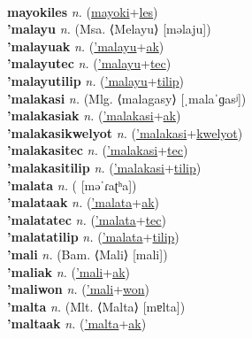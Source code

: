  \label{mayoki} \\
\textbf{mayokiles} \textit{n.} (\hyperref[mayoki]{mayoki}+\hyperref[les]{les})
 \label{mayokiles} \\
\textbf{'malayu} \textit{n.} (Msa. ⟨Melayu⟩ [məlaju])
 \label{'malayu} \\
\textbf{'malayuak} \textit{n.} (\hyperref['malayu]{'malayu}+\hyperref[ak]{ak})
 \label{'malayuak} \\
\textbf{'malayutec} \textit{n.} (\hyperref['malayu]{'malayu}+\hyperref[tec]{tec})
 \label{'malayutec} \\
\textbf{'malayutilip} \textit{n.} (\hyperref['malayu]{'malayu}+\hyperref[tilip]{tilip})
 \label{'malayutilip} \\
\textbf{'malakasi} \textit{n.} (Mlg. ⟨malagasy⟩ [ˌmalaˈɡasʲ])
 \label{'malakasi} \\
\textbf{'malakasiak} \textit{n.} (\hyperref['malakasi]{'malakasi}+\hyperref[ak]{ak})
 \label{'malakasiak} \\
\textbf{'malakasikwelyot} \textit{n.} (\hyperref['malakasi]{'malakasi}+\hyperref[kwelyot]{kwelyot})
 \label{'malakasikwelyot} \\
\textbf{'malakasitec} \textit{n.} (\hyperref['malakasi]{'malakasi}+\hyperref[tec]{tec})
 \label{'malakasitec} \\
\textbf{'malakasitilip} \textit{n.} (\hyperref['malakasi]{'malakasi}+\hyperref[tilip]{tilip})
 \label{'malakasitilip} \\
\textbf{'malata} \textit{n.} ( [məˈɾaʈʰa])
 \label{'malata} \\
\textbf{'malataak} \textit{n.} (\hyperref['malata]{'malata}+\hyperref[ak]{ak})
 \label{'malataak} \\
\textbf{'malatatec} \textit{n.} (\hyperref['malata]{'malata}+\hyperref[tec]{tec})
 \label{'malatatec} \\
\textbf{'malatatilip} \textit{n.} (\hyperref['malata]{'malata}+\hyperref[tilip]{tilip})
 \label{'malatatilip} \\
\textbf{'mali} \textit{n.} (Bam. ⟨Mali⟩ [mali])
 \label{'mali} \\
\textbf{'maliak} \textit{n.} (\hyperref['mali]{'mali}+\hyperref[ak]{ak})
 \label{'maliak} \\
\textbf{'maliwon} \textit{n.} (\hyperref['mali]{'mali}+\hyperref[won]{won})
 \label{'maliwon} \\
\textbf{'malta} \textit{n.} (Mlt. ⟨Malta⟩ [mɐlta])
 \label{'malta} \\
\textbf{'maltaak} \textit{n.} (\hyperref['malta]{'malta}+\hyperref[ak]{ak})
